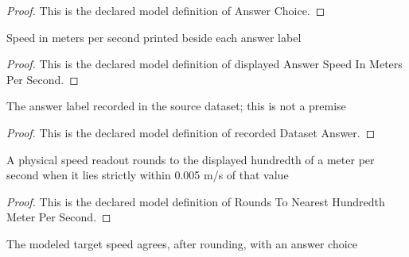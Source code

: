 \begin{proof}
  This is the declared model definition of Answer Choice.
\end{proof}
\begin{definition}
  \label{def:physics:phyx-mini-0327:phyxminiproblems-problemphyxmini0327-displayedanswerspeedinmeterspersecond}
  Speed in meters per second printed beside each answer label
\end{definition}
\begin{proof}
  This is the declared model definition of displayed Answer Speed In Meters Per Second.
\end{proof}
\begin{definition}
  \label{def:physics:phyx-mini-0327:phyxminiproblems-problemphyxmini0327-recordeddatasetanswer}
  The answer label recorded in the source dataset; this is not a premise
\end{definition}
\begin{proof}
  This is the declared model definition of recorded Dataset Answer.
\end{proof}
\begin{definition}
  \label{def:physics:phyx-mini-0327:phyxminiproblems-problemphyxmini0327-roundstonearesthundredthmeterpersecond}
  A physical speed readout rounds to the displayed hundredth of a meter per second when it lies strictly within 0.005 m/s of that value
\end{definition}
\begin{proof}
  This is the declared model definition of Rounds To Nearest Hundredth Meter Per Second.
\end{proof}
\begin{definition}
  \label{def:physics:phyx-mini-0327:phyxminiproblems-problemphyxmini0327-matchesanswerchoice}
  The modeled target speed agrees, after rounding, with an answer choice
\end{definition}
